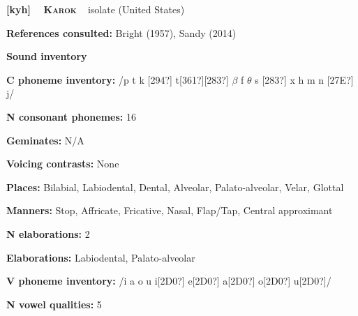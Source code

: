 \clearpage\begin{styleBody}
\textbf{[kyh] }\ \ \textbf{\textsc{Karok}}\textbf{\ \ }isolate (United States)
\end{styleBody}

\begin{styleBody}
\textbf{References consulted: }Bright (1957), Sandy (2014)
\end{styleBody}

\begin{styleBody}
\textbf{Sound inventory}
\end{styleBody}

\begin{styleBody}
\textbf{C phoneme inventory:} /p t k [294?] t[361?][283?] $\beta $ f $\theta $ s [283?] x h m n [27E?] j/
\end{styleBody}

\begin{styleBody}
\textbf{N consonant phonemes:} 16
\end{styleBody}

\begin{styleBody}
\textbf{Geminates:} N/A
\end{styleBody}

\begin{styleBody}
\textbf{Voicing contrasts:} None
\end{styleBody}

\begin{styleBody}
\textbf{Places:} Bilabial, Labiodental, Dental, Alveolar, Palato-alveolar, Velar, Glottal
\end{styleBody}

\begin{styleBody}
\textbf{Manners:} Stop, Affricate, Fricative, Nasal, Flap/Tap, Central approximant
\end{styleBody}

\begin{styleBody}
\textbf{N elaborations:} 2
\end{styleBody}

\begin{styleBody}
\textbf{Elaborations:} Labiodental, Palato-alveolar
\end{styleBody}

\begin{styleBody}
\textbf{V phoneme inventory:} /i a o u i[2D0?] e[2D0?] a[2D0?] o[2D0?] u[2D0?]/
\end{styleBody}

\begin{styleBody}
\textbf{N vowel qualities:} 5
\end{styleBody}

